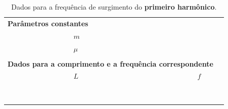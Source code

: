 \begin{table}[!htb]
\forcerectofloat
\caption{Dados para a frequência de surgimento do \textbf{primeiro harmônico}.}
\label{Tab:FrequenciaFuncaoComprimento1}
	\begin{center}
		\begin{tabular}{cp{45mm}p{45mm}c}
		\toprule
\multicolumn{2}{l}{\textbf{Parâmetros constantes}}&\\
		\cmidrule{2-3}
		& \cellcolor[gray]{0.89}$m$ &\cellcolor[gray]{0.92} \\
		& \cellcolor[gray]{0.95}$\mu$ & \cellcolor[gray]{0.97}\\
		\cmidrule{2-3}
		\\
\multicolumn{3}{l}{\textbf{Dados para a comprimento e a frequência correspondente}} \\
		\cmidrule{2-3}		
		& $L$ & $f$ &\\
		\cmidrule{2-3}
		& \cellcolor[gray]{0.89} & \cellcolor[gray]{0.92} \\
		& \cellcolor[gray]{0.95} & \cellcolor[gray]{0.97} \\
		& \cellcolor[gray]{0.89} & \cellcolor[gray]{0.92} \\
		& \cellcolor[gray]{0.95} & \cellcolor[gray]{0.97} \\
		& \cellcolor[gray]{0.89} & \cellcolor[gray]{0.92} \\
		& \cellcolor[gray]{0.95} & \cellcolor[gray]{0.97} \\
		& \cellcolor[gray]{0.89} & \cellcolor[gray]{0.92} \\
		& \cellcolor[gray]{0.95} & \cellcolor[gray]{0.97} \\
		\cmidrule{2-3}
		\bottomrule
		\end{tabular}
	\end{center}
\end{table}

